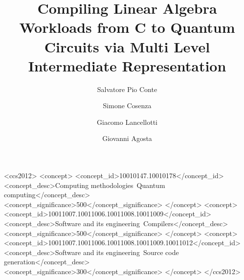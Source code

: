 \documentclass[sigconf]{acmart}
\begin{document}
\title{Compiling Linear Algebra Workloads from C to Quantum Circuits via Multi Level Intermediate Representation}

\author{Salvatore Pio Conte}

\author{Simone Cosenza}

\author{Giacomo Lancellotti}

\author{Giovanni Agosta}

\renewcommand{\shortauthors}{Conte and Cosenza et al.}



\begin{CCSXML}
<ccs2012>
 <concept>
  <concept_id>10010147.10010178</concept_id>
  <concept_desc>Computing methodologies~Quantum computing</concept_desc>
  <concept_significance>500</concept_significance>
 </concept>
 <concept>
  <concept_id>10011007.10011006.10011008.10011009</concept_id>
  <concept_desc>Software and its engineering~Compilers</concept_desc>
  <concept_significance>500</concept_significance>
 </concept>
 <concept>
  <concept_id>10011007.10011006.10011008.10011009.10011012</concept_id>
  <concept_desc>Software and its engineering~Source code generation</concept_desc>
  <concept_significance>300</concept_significance>
 </concept>
</ccs2012>
\end{CCSXML}



\maketitle







\begin{acks}
\end{acks}



\end{document}
